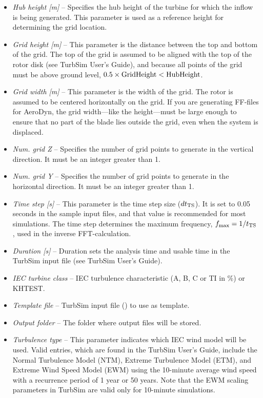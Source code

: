 \begin{itemize}
\item{\sl Hub height [m]} -- Specifies
  the hub height of the turbine for which the inflow is being generated. This
  parameter is used as a reference height for determining the grid location.
\item{\sl Grid height [m]} --
  This parameter is the distance between the top and bottom of the grid.
  The top of the grid is assumed to be aligned with the top of the rotor disk
  (see TurbSim User's Guide), and because all points of the grid must be above
  ground level, $0.5\times{\rm GridHeight}<{\rm HubHeight}$.
\item{\sl Grid width [m]} --
  This parameter is the width of the grid.
  The rotor is assumed to be centered horizontally on the grid.
  If you are generating FF-files for AeroDyn,
  the grid width---like the height---must be large enough to ensure that
  no part of the blade lies outside the grid, even when the system is displaced.
\item{\sl Num. grid Z} --
  Specifies the number of grid points to generate in the vertical direction.
  It must be an integer greater than 1.
\item{\sl Num. grid Y} --
  Specifies the number of grid points to generate in the horizontal direction.
  It must be an integer greater than 1.
\item{\sl Time step [s]} --
  This parameter is the time step size ($dt_{\rm TS}$).
  It is set to 0.05 seconds in the sample input files, and that value is
  recommended for most simulations. The time step determines the maximum
  frequency, $f_{\rm max}=1/t_{\rm TS}$, used in the inverse FFT-calculation.
\item{\sl Duration [s]} --
  Duration sets the analysis time and usable time in the TurbSim input file
  (see TurbSim User's Guide).
\item{\sl IEC turbine class} --
  IEC turbulence characteristic (A, B, C or TI in \%) or KHTEST.
\item{\sl Template file} --
  TurbSim input file () to use as template.
\item{\sl Output folder} --
  The folder where output files will be stored.

\item{\sl Turbulence type} --
  This parameter indicates which IEC wind model will be used.
  Valid entries, which are found in the TurbSim User's Guide,
  include the Normal Turbulence Model (NTM), Extreme Turbulence Model (ETM),
  and Extreme Wind Speed Model (EWM) using the 10-minute average wind speed
  with a recurrence period of 1 year or 50 years. Note that the
  EWM scaling parameters in TurbSim are valid only for 10-minute simulations.


\end{itemize}
